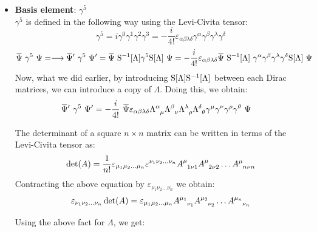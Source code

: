 \begin{itemize}
\begin{align*}
    &=\frac{i}{2}\qty{\dadj{\Psi} \qty(\trmat{\mu}{\alpha}\gamma^\alpha \trmat{\nu}{\beta}\gamma^\beta -\trmat{\nu}{\beta}\gamma^\beta \trmat{\mu}{\alpha} \gamma^\alpha)\Psi}\\
    &=\trmat{\mu}{\alpha} \trmat{\nu}{\beta} \frac{i}{2}\dadj{\Psi}\comtr{\gamma^\alpha}{\gamma^\beta}\Psi\\
    &=\trmat{\mu}{\alpha} \trmat{\nu}{\beta} \qty(\dadj{\Psi}\ \Sigma^{\alpha\beta}\ \Psi)
  \end{align*}
  This quantity transforms with two copies of $\Lambda$ and hence, acts as a rank-2 contravariant tensor. We denote it by $\ST^{\mu\nu}$
  \item  \textbf{Basis element}: $\gamma^5$\\[0.2cm]
  $\gamma^5$ is defined in the following way using the Levi-Civita tensor:
  $$\gamma^5 = i \gamma^0\gamma^1\gamma^2\gamma^3 = -\frac{i}{4!}\varepsilon_{\alpha\beta\lambda\delta}\gamma^\alpha\gamma^\beta\gamma^\lambda\gamma^\delta$$
\begin{align*}
  \bili{\gamma^5} =  \longrightarrow \dadj{\Psi}'\ \gamma^5 \ \Psi' &= \dadj{\Psi}\ \lrepinv \gamma^5\lrep \ \Psi = -\frac{i}{4!}\varepsilon_{\alpha\beta\lambda\delta}  \dadj{\Psi}\ \lrepinv \ \gamma^\alpha\gamma^\beta\gamma^\lambda\gamma^\delta \lrep\ \Psi
\end{align*}
Now, what we did earlier, by introducing $\mathrm{S}[\Lambda] \mathrm{S}^{-1}[\Lambda]$ between each Dirac matrices, we can introduce a copy of $\Lambda$. Doing this, we obtain:
\begin{align*}
  \dadj{\Psi}'\ \gamma^5 \ \Psi' &=-\frac{i}{4!}\ \dadj{\Psi} \varepsilon_{\alpha\beta\lambda\delta} \trmat{\alpha}{\mu}\trmat{\beta}{\nu}\trmat{\lambda}{\rho}\trmat{\delta}{\theta}\gamma^\mu\gamma^\nu\gamma^\rho\gamma^\theta \ \Psi
\end{align*}
\begin{ffact}
  The determinant of a square $n\times n$ matrix can be written in terms of the Levi-Civita tensor as:
$$\det (A) = \frac{1}{n!}\varepsilon_{\mu_1 \mu_2\ldots \mu_n}\varepsilon^{\nu_1 \nu_2\ldots \nu_n} \tensor{A}{^\mu_1 _\nu_1}\tensor{A}{^\mu_2 _\nu_2}\ldots \tensor{A}{^\mu_n _\nu_n} $$
Contracting the above equation by $\varepsilon_{\nu_1 \nu_2\ldots \nu_n} $ we obtain:
$$\varepsilon_{\nu_1 \nu_2\ldots \nu_n} \det (A) = \varepsilon_{\mu_1 \mu_2\ldots \mu_n}\tensor{A}{^{\mu_1} _{\nu_1}}\tensor{A}{^{\mu_2} _{\nu_2}}\ldots \tensor{A}{^{\mu_n} _{\nu_n}}  $$
\end{ffact}
\noindent
Using the above fact for $\Lambda$, we get:
\begin{align*}

\end{align*}
\end{itemize}
